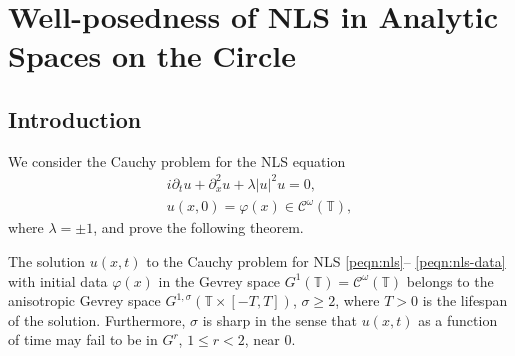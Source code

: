\chapter{Well-posedness of NLS in Analytic Spaces on the Circle}
%
%
%
%
%
%
\section{Introduction}
\label{psec:introduction}
We consider the Cauchy problem for the NLS equation
%
\begin{gather}
  \label{peqn:nls}
  i\partial_tu+\partial_x^2u+\lambda |u|^2u=0,
  \\
  \label{peqn:nls-data}
  u(x,0)=\varphi(x) \in \mathcal{C}^\omega(\mathbb{T}),
\end{gather}
%
where $\lambda =\pm 1$, and prove the following theorem.
%
\begin{theorem}
  \label{pthm:nls-analyt}
  The solution $u(x,t)$  to the Cauchy problem for NLS \eqref{peqn:nls}--
  \eqref{peqn:nls-data}  with   initial data $\varphi(x)$  in  the Gevrey space
  $G^1(\mathbb{T})=\mathcal{C}^\omega(\mathbb{T})$ belongs to the anisotropic
  Gevrey space $G^{1, \sigma}( \mathbb{T}\times [-T, T])$,  $\sigma \ge 2$, where
  $T>0$ is the lifespan of the solution. Furthermore, $\sigma$ is sharp in the
  sense that $u(x,t)$ as a function of  time  may fail to be in $G^r$, $1\le
  r<2$, near $0$.
\end{theorem}
%
%
%
%
%
%

%
%
%
%
%
%
%
%
